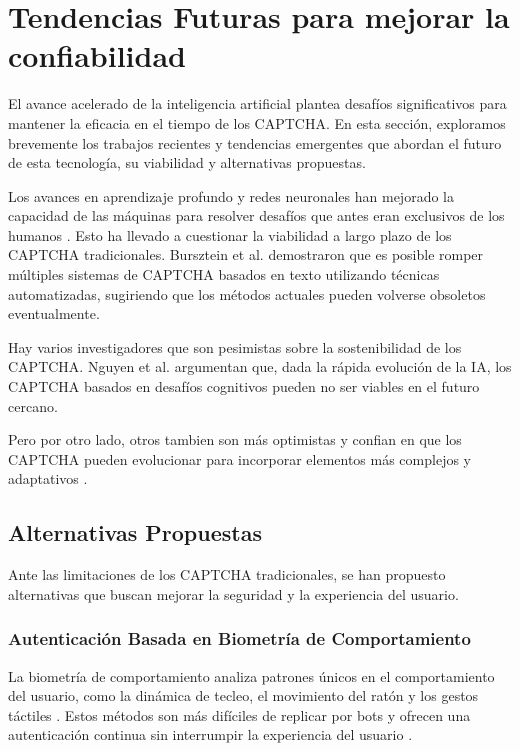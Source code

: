 \documentclass[conference]{IEEEtran}
\begin{document}
\bigskip

\section{Tendencias Futuras para mejorar la confiabilidad}

El avance acelerado de la inteligencia artificial plantea desafíos significativos para mantener la eficacia en el tiempo de los CAPTCHA. En esta sección, exploramos brevemente los trabajos recientes y tendencias emergentes que abordan el futuro de esta tecnología, su viabilidad y alternativas propuestas.

Los avances en aprendizaje profundo y redes neuronales han mejorado la capacidad de las máquinas para resolver desafíos que antes eran exclusivos de los humanos \cite{Goodfellow2014}. Esto ha llevado a cuestionar la viabilidad a largo plazo de los CAPTCHA tradicionales. Bursztein et al. \cite{Bursztein2014} demostraron que es posible romper múltiples sistemas de CAPTCHA basados en texto utilizando técnicas automatizadas, sugiriendo que los métodos actuales pueden volverse obsoletos eventualmente.

Hay varios investigadores que son pesimistas sobre la sostenibilidad de los CAPTCHA. Nguyen et al. \cite{Nguyen2020} argumentan que, dada la rápida evolución de la IA, los CAPTCHA basados en desafíos cognitivos pueden no ser viables en el futuro cercano. 

Pero por otro lado, otros tambien son más optimistas y confian en que los CAPTCHA pueden evolucionar para incorporar elementos más complejos y adaptativos \cite{Huang2018}.

\subsection{Alternativas Propuestas}

Ante las limitaciones de los CAPTCHA tradicionales, se han propuesto alternativas que buscan mejorar la seguridad y la experiencia del usuario.

\subsubsection{Autenticación Basada en Biometría de Comportamiento}

La biometría de comportamiento analiza patrones únicos en el comportamiento del usuario, como la dinámica de tecleo, el movimiento del ratón y los gestos táctiles \cite{Teh2016}. Estos métodos son más difíciles de replicar por bots y ofrecen una autenticación continua sin interrumpir la experiencia del usuario \cite{Murdoch2020}.
\end{document}

